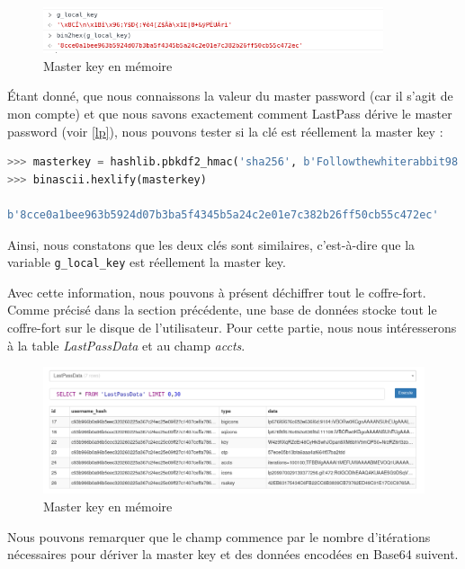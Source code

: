 \begin{figure}[H]
	\centering
	\includegraphics[width=10cm]{images/lp_master_key.png}
	\caption{Master key en mémoire}
\end{figure} 

Étant donné, que nous connaissons la valeur du master password (car il s'agit de mon compte) et que nous savons exactement comment LastPass dérive le master password (voir \ref{lp}), nous pouvons tester si la clé est réellement la master key :

\begin{lstlisting}[language=python, caption=Calcul de la master key sur LastPass]
>>> masterkey = hashlib.pbkdf2_hmac('sha256', b'Followthewhiterabbit98', b'noemie.plancherel@gmail.com', 100100, 32)
>>> binascii.hexlify(masterkey)

b'8cce0a1bee963b5924d07b3ba5f4345b5a24c2e01e7c382b26ff50cb55c472ec'

\end{lstlisting}

Ainsi, nous constatons que les deux clés sont similaires, c'est-à-dire que la variable \verb|g_local_key| est réellement la master key.

Avec cette information, nous pouvons à présent déchiffrer tout le coffre-fort. Comme précisé dans la section précédente, une base de données stocke tout le coffre-fort sur le disque de l'utilisateur. Pour cette partie, nous nous intéresserons à la table \textit{LastPassData} et au champ \textit{accts}. 

\begin{figure}[H]
	\centering
	\includegraphics[width=15.5cm]{images/lp_data.png}
	\caption{Master key en mémoire}
\end{figure} 

Nous pouvons remarquer que le champ commence par le nombre d'itérations nécessaires pour dériver la master key et des données encodées en Base64 suivent. 


